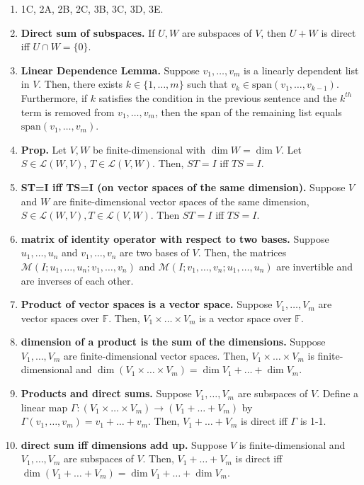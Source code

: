 

\begin{enumerate}
	\item 1C, 2A, 2B, 2C, 3B, 3C, 3D, 3E. 
	\item \textbf{Direct sum of subspaces. } If $U,W$ are subspaces of $V$, then $U + W$ is direct iff $U \cap W = \{0\}$. 	
	\item \textbf{Linear Dependence Lemma. } Suppose $v_1,\dots,v_m$ is a linearly dependent list in $V$. Then, there exists $k \in \{1,\dots,m\}$ such that $v_k \in \textrm{span}(v_1,\dots,v_{k-1})$. Furthermore, if $k$ satisfies the condition in the previous sentence and the $k^{th}$ term is removed from $v_1,\dots,v_m$, then the span of the remaining list equals $\textrm{span}(v_1,\dots,v_m)$. 
	\item \textbf{Prop. } Let $V,W$ be finite-dimensional with $\dim W = \dim V$. Let $S \in \mathscr{L}(W,V)$, $T \in \mathscr{L}(V,W)$. Then, $ST=I$ iff $TS=I$. 
	\item \textbf{ST=I iff TS=I (on vector spaces of the same dimension). } Suppose $V$ and $W$ are finite-dimensional vector spaces of the same dimension, $S \in \mathscr{L}(W,V), T \in \mathscr{L}(V,W)$. Then $ST=I$ iff $TS=I$. 
	\item \textbf{matrix of identity operator with respect to two bases. } Suppose $u_1,\dots,u_n$ and $v_1,\dots,v_n$ are two bases of $V$. Then, the matrices $\mathscr{M}(I; u_1,\dots,u_n; v_1,\dots,v_n)$ and $\mathscr{M}(I; v_1,\dots,v_n; u_1,\dots,u_n)$ are invertible and are inverses of each other. 
	\item \textbf{Product of vector spaces is a vector space. } Suppose $V_1,\dots,V_m$ are vector spaces over $\mathbb{F}$. Then, $V_1 \times \dots \times V_m$ is a vector space over $\mathbb{F}$. 
	\item \textbf{dimension of a product is the sum of the dimensions. } Suppose $V_1,\dots,V_m$ are finite-dimensional vector spaces. Then, $V_1 \times \dots \times V_m$ is finite-dimensional and $\dim(V_1 \times \dots \times V_m) = \dim V_1 + \dots + \dim V_m$. 
	\item \textbf{Products and direct sums. } Suppose $V_1,\dots,V_m$ are subspaces of $V$. Define a linear map $\Gamma: (V_1 \times \dots \times V_m) \to (V_1 + \dots + V_m)$ by $\Gamma(v_1,\dots,v_m) = v_1 + \dots + v_m$. Then, $V_1 + \dots + V_m$ is direct iff $\Gamma$ is 1-1. 
	\item \textbf{direct sum iff dimensions add up. } Suppose $V$ is finite-dimensional and $V_1,\dots,V_m$ are subspaces of $V$. Then, $V_1 + \dots + V_m$ is direct iff $\dim(V_1 + \dots + V_m) = \dim V_1 + \dots + \dim V_m$. 

\end{enumerate}
